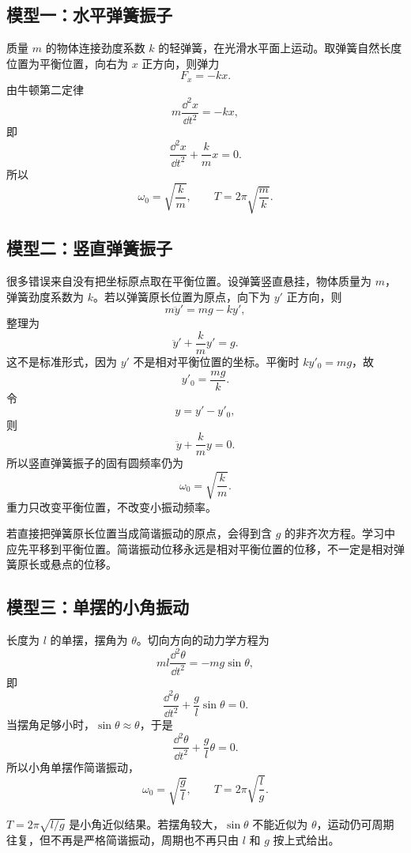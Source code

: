 \subsection*{模型一：水平弹簧振子}

质量 $m$ 的物体连接劲度系数 $k$ 的轻弹簧，在光滑水平面上运动。取弹簧自然长度位置为平衡位置，向右为 $x$ 正方向，则弹力
\[
  F_x=-kx.
\]
由牛顿第二定律
\[
  m\frac{\dd^2x}{\dd t^2}=-kx,
\]
即
\[
  \frac{\dd^2x}{\dd t^2}+\frac{k}{m}x=0.
\]
所以
\[
  \omega_0=\sqrt{\frac{k}{m}},\qquad
  T=2\pi\sqrt{\frac{m}{k}}.
\]

\subsection*{模型二：竖直弹簧振子}

很多错误来自没有把坐标原点取在平衡位置。设弹簧竖直悬挂，物体质量为 $m$，弹簧劲度系数为 $k$。若以弹簧原长位置为原点，向下为 $y'$ 正方向，则
\[
  m\ddot y'=mg-ky',
\]
整理为
\[
  \ddot y'+\frac{k}{m}y'=g.
\]
这不是标准形式，因为 $y'$ 不是相对平衡位置的坐标。平衡时 $ky'_0=mg$，故
\[
  y'_0=\frac{mg}{k}.
\]
令
\[
  y=y'-y'_0,
\]
则
\[
  \ddot y+\frac{k}{m}y=0.
\]
所以竖直弹簧振子的固有圆频率仍为
\[
  \omega_0=\sqrt{\frac{k}{m}}.
\]
重力只改变平衡位置，不改变小振动频率。

\begin{pitfall}[竖直弹簧的常见错法]
若直接把弹簧原长位置当成简谐振动的原点，会得到含 $g$ 的非齐次方程。学习中应先平移到平衡位置。简谐振动位移永远是相对平衡位置的位移，不一定是相对弹簧原长或悬点的位移。
\end{pitfall}

\subsection*{模型三：单摆的小角振动}

长度为 $l$ 的单摆，摆角为 $\theta$。切向方向的动力学方程为
\[
  ml\frac{\dd^2\theta}{\dd t^2}=-mg\sin\theta,
\]
即
\[
  \frac{\dd^2\theta}{\dd t^2}+\frac{g}{l}\sin\theta=0.
\]
当摆角足够小时，$\sin\theta\approx\theta$，于是
\[
  \frac{\dd^2\theta}{\dd t^2}+\frac{g}{l}\theta=0.
\]
所以小角单摆作简谐振动，
\[
  \omega_0=\sqrt{\frac{g}{l}},\qquad
  T=2\pi\sqrt{\frac{l}{g}}.
\]

\begin{attention}[单摆公式的适用条件]
$T=2\pi\sqrt{l/g}$ 是小角近似结果。若摆角较大，$\sin\theta$ 不能近似为 $\theta$，运动仍可周期往复，但不再是严格简谐振动，周期也不再只由 $l$ 和 $g$ 按上式给出。
\end{attention}

